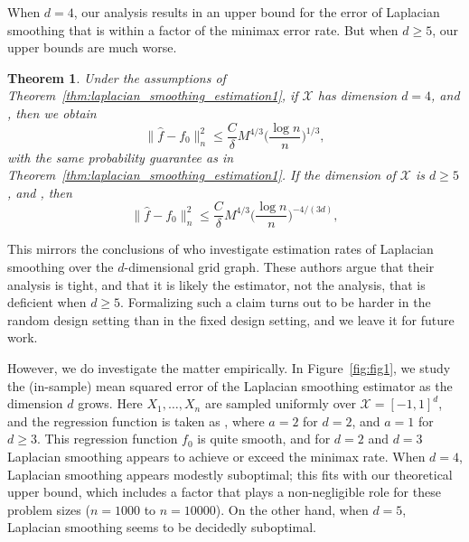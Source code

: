 \documentclass[twoside]{article}
\newcommand{\1}{\mathbf{1}}
\newcommand{\Xset}{\mathcal{X}}
\newcommand{\wh}[1]{\widehat{#1}}
\newtheorem{theorem}{Theorem}
\theoremstyle{definition}
\theoremstyle{remark}
\begin{document}
When $d = 4$, our analysis results in an upper bound for the error of Laplacian smoothing that is within a  factor of the minimax error rate. But when $d \geq 5$, our upper bounds are much worse.
\begin{theorem}
	\label{thm:laplacian_smoothing_estimation2}
  Under the assumptions of Theorem~\ref{thm:laplacian_smoothing_estimation1}, if $\Xset$ has dimension $d = 4$,  and , then we obtain 
	\begin{equation*}
	\bigl\|\wh{f} - f_0\bigr\|_n^2 \leq \frac{C}{\delta} M^{4/3} \biggl(\frac{\log n}{n}\biggr)^{1/3},
	\end{equation*}
with the same probability guarantee as in Theorem~\ref{thm:laplacian_smoothing_estimation1}. If the dimension of $\Xset$ is $d \geq 5$,  and , then
	\begin{equation*}
	\bigl\|\wh{f} - f_0\bigr\|_n^2 \leq \frac{C}{\delta} M^{4/3} \biggl(\frac{\log n}{n}\biggr)^{-4/(3d)},
	\end{equation*}
\end{theorem}
This mirrors the conclusions of \citet{sadhanala16} who investigate estimation rates of Laplacian smoothing over the $d$-dimensional grid graph. These authors argue that their analysis is tight, and that it is likely the estimator, not the analysis, that is deficient when $d \geq 5$. Formalizing such a claim turns out to be harder in the random design setting than in the fixed design setting, and we leave it for future work. 

However, we do investigate the matter empirically. In Figure~\ref{fig:fig1}, we study the (in-sample) mean squared error of the Laplacian smoothing estimator as the dimension $d$ grows. Here $X_1,\ldots,X_n$ are sampled uniformly over $\Xset = [-1,1]^d$, and the regression function is taken as , where $a = 2$ for $d = 2$, and $a = 1$ for $d \geq 3$. This regression function $f_0$ is quite smooth, and for $d = 2$ and $d = 3$ Laplacian smoothing appears to achieve or exceed the minimax rate. When $d = 4$, Laplacian smoothing appears modestly suboptimal; this fits with our theoretical upper bound, which includes a  factor that plays a non-negligible role for these problem sizes ($n=1000$ to $n=10000$). On the other hand, when $d = 5$, Laplacian smoothing seems to be decidedly suboptimal. 
\end{document}
